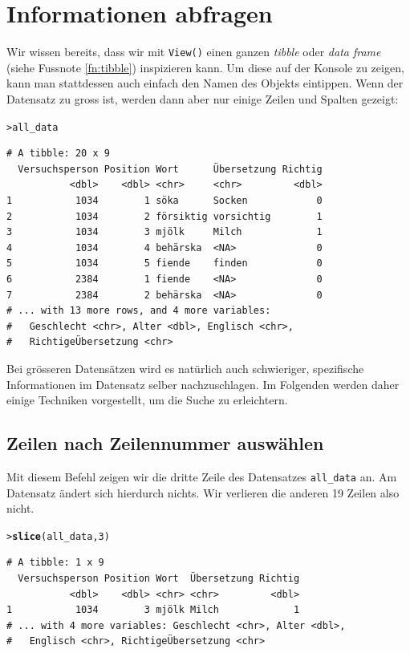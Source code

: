 \documentclass[oneside, 10pt]{book}\usepackage[]{graphicx}\usepackage[]{xcolor}
\makeatletter
\newcommand{\hlnum}[1]{\textcolor[rgb]{0.686,0.059,0.569}{#1}}%
\newcommand{\hlstd}[1]{\textcolor[rgb]{0.345,0.345,0.345}{#1}}%
\newcommand{\hlkwd}[1]{\textcolor[rgb]{0.737,0.353,0.396}{\textbf{#1}}}%
\newenvironment{kframe}{%
 \def\at@end@of@kframe{}%
 \ifinner\ifhmode%
  \def\at@end@of@kframe{\end{minipage}}%
  \begin{minipage}{\columnwidth}%
 \fi\fi%
 \def\FrameCommand##1{\hskip\@totalleftmargin \hskip-\fboxsep
 \colorbox{shadecolor}{##1}\hskip-\fboxsep
     \hskip-\linewidth \hskip-\@totalleftmargin \hskip\columnwidth}%
 \MakeFramed {\advance\hsize-\width
   \@totalleftmargin\z@ \linewidth\hsize
   \@setminipage}}%
 {\par\unskip\endMakeFramed%
 \at@end@of@kframe}
\newenvironment{knitrout}{}{} %
\makeatother
\begin{document}
\section{Informationen abfragen}
Wir wissen bereits, dass wir mit \texttt{View()} einen
ganzen \textit{tibble} oder \textit{data frame} (siehe Fussnote
\ref{fn:tibble}) inspizieren kann. Um diese
auf der Konsole zu zeigen, kann man stattdessen auch einfach
den Namen des Objekts eintippen. Wenn der Datensatz zu gross ist,
werden dann aber nur einige Zeilen und Spalten gezeigt:

\begin{knitrout}
\color{fgcolor}\begin{kframe}
\begin{alltt}
\hlstd{> }\hlstd{all_data}
\end{alltt}
\begin{verbatim}
# A tibble: 20 x 9
  Versuchsperson Position Wort      Übersetzung Richtig
           <dbl>    <dbl> <chr>     <chr>         <dbl>
1           1034        1 söka      Socken            0
2           1034        2 försiktig vorsichtig        1
3           1034        3 mjölk     Milch             1
4           1034        4 behärska  <NA>              0
5           1034        5 fiende    finden            0
6           2384        1 fiende    <NA>              0
7           2384        2 behärska  <NA>              0
# ... with 13 more rows, and 4 more variables:
#   Geschlecht <chr>, Alter <dbl>, Englisch <chr>,
#   RichtigeÜbersetzung <chr>
\end{verbatim}
\end{kframe}
\end{knitrout}

Bei grösseren Datensätzen wird es natürlich auch schwieriger,
spezifische Informationen im Datensatz selber nachzuschlagen.
Im Folgenden werden daher einige Techniken vorgestellt, um
die Suche zu erleichtern.

\subsection{Zeilen nach Zeilennummer auswählen}
Mit diesem Befehl zeigen wir die dritte Zeile des Datensatzes
\texttt{all\_data} an. Am Datensatz ändert sich hierdurch nichts. 
Wir verlieren die anderen 19 Zeilen also nicht.
\begin{knitrout}
\color{fgcolor}\begin{kframe}
\begin{alltt}
\hlstd{> }\hlkwd{slice}\hlstd{(all_data,} \hlnum{3}\hlstd{)}
\end{alltt}
\begin{verbatim}
# A tibble: 1 x 9
  Versuchsperson Position Wort  Übersetzung Richtig
           <dbl>    <dbl> <chr> <chr>         <dbl>
1           1034        3 mjölk Milch             1
# ... with 4 more variables: Geschlecht <chr>, Alter <dbl>,
#   Englisch <chr>, RichtigeÜbersetzung <chr>
\end{verbatim}
\end{kframe}
\end{knitrout}
\end{document}
